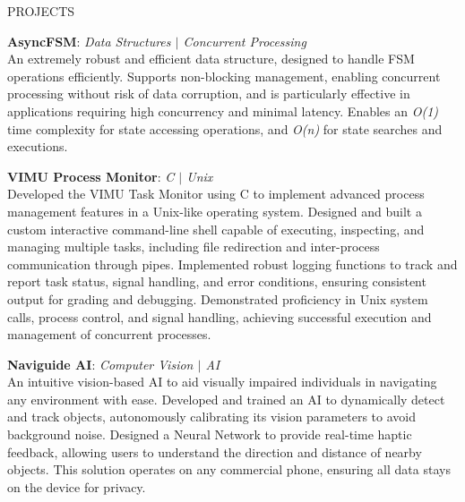 \documentclass{resume} %
\begin{document}
\vspace{1em}
\begin{rSection}{PROJECTS}
\vspace{-0.75em}
\item{\textbf{AsyncFSM}}: \textit{Data Structures $\vert$ Concurrent Processing} \vspace{0.25em} \\
{An extremely robust and efficient data structure, designed to handle FSM operations efficiently. Supports non-blocking management, enabling concurrent processing without risk of data corruption, and is particularly effective in applications requiring high concurrency and minimal latency. Enables an \textit{O(1)} time complexity for state accessing operations, and \textit{O(n)} for state searches and executions.}

\item{\textbf{VIMU Process Monitor}}: \textit{C $\vert$ Unix} \vspace{0.25em} \\
{Developed the VIMU Task Monitor using C to implement advanced process management features in a Unix-like operating system. Designed and built a custom interactive command-line shell capable of executing, inspecting, and managing multiple tasks, including file redirection and inter-process communication through pipes. Implemented robust logging functions to track and report task status, signal handling, and error conditions, ensuring consistent output for grading and debugging. Demonstrated proficiency in Unix system calls, process control, and signal handling, achieving successful execution and management of concurrent processes.}

\item{\textbf{Naviguide AI}}: \textit{Computer Vision $\vert$ AI} \vspace{0.25em}\\
{An intuitive vision-based AI to aid visually impaired individuals in navigating any environment with ease. Developed and trained an AI to dynamically detect and track objects, autonomously calibrating its vision parameters to avoid background noise. Designed a Neural Network to provide real-time haptic feedback, allowing users to understand the direction and distance of nearby objects. This solution operates on any commercial phone, ensuring all data stays on the device for privacy.}


\end{rSection}
\end{document}
